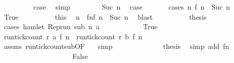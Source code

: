 \begin{isabellebody}
\ \ \ \ \ \ \isamarkupfalse%
\ \isamarkupfalse%
\ {\isacharquery}case\ \isamarkupfalse%
\ simp\isanewline
\ \ \isamarkupfalse%
\isanewline
\ \ \ \ \isamarkupfalse%
\ {\isacharparenleft}Suc\ n{\isacharprime}{\isacharparenright}\ \isamarkupfalse%
\ {\isacharquery}case\ \isanewline
\ \ \ \ \isamarkupfalse%
\ {\isacharparenleft}cases\ {\isacartoucheopen}{\isasymexists}n\ f\ n\ {\isacharequal}\ Suc\ n{\isacharprime}{\isacartoucheclose}{\isacharparenright}\isanewline
\ \ \ \ \ \ \isamarkupfalse%
\ True\isanewline
\ \ \ \ \ \ \ \ \isamarkupfalse%
\ this\ \isamarkupfalse%
\ n\ \ fn{}{\isacharcolon}{\isacartoucheopen}f\ n\ {\isacharequal}\ Suc\ n{\isacharprime}{\isacartoucheclose}\ \isamarkupfalse%
\ blast\isanewline
\ \ \ \ \ \ \ \ \isamarkupfalse%
\ {\isacharquery}thesis\isanewline
\ \ \ \ \ \ \ \ \isamarkupfalse%
\ {\isacharparenleft}cases\ {\isacartoucheopen}hamlet\ {\isacharparenleft}{\isacharparenleft}Rep{\isacharunderscore}run\ sub{\isacharparenright}\ n\ a{\isacharparenright}{\isacartoucheclose}{\isacharparenright}\isanewline
\ \ \ \ \ \ \ \ \ \ \isamarkupfalse%
\ True\isanewline
\ \ \ \ \ \ \ \ \ \ \ \ \isamarkupfalse%
\ {\isacartoucheopen}run{\isacharunderscore}tick{\isacharunderscore}count\ r\ a\ {\isacharparenleft}f\ n\ {\isasymle}\ run{\isacharunderscore}tick{\isacharunderscore}count\ r\ b\ {\isacharparenleft}f\ n\isanewline
\ \ \ \ \ \ \ \ \ \ \ \ \ \ \isamarkupfalse%
\ assms{\isacharparenleft}{}{\isacharparenright}\ run{\isacharunderscore}tick{\isacharunderscore}count{\isacharunderscore}sub{\isacharbrackleft}OF\ {\isacharasterisk}{\isacharbrackright}\ \isamarkupfalse%
\ simp\isanewline
\ \ \ \ \ \ \ \ \ \ \ \ \isamarkupfalse%
\ {\isacharquery}thesis\ \isamarkupfalse%
\ {\isacharparenleft}simp\ add{\isacharcolon}\ fn{}{\isacharparenright}\isanewline
\ \ \ \ \ \ \ \ \isamarkupfalse%
\isanewline
\ \ \ \ \ \ \ \ \ \ \isamarkupfalse%
\ False\isanewline
\ \ \ \ \ \ \ \ \ \ \ \ \isamarkupfalse%

\end{isabellebody}
